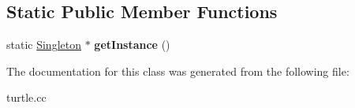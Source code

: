\subsection*{Static Public Member Functions}
\begin{DoxyCompactItemize}
\item 
static \hyperlink{classSingleton}{Singleton} $\ast$ {\bfseries get\+Instance} ()\hypertarget{classSingleton_af8429228a6d84251c342c4f90fc73f44}{}\label{classSingleton_af8429228a6d84251c342c4f90fc73f44}

\end{DoxyCompactItemize}


The documentation for this class was generated from the following file\+:\begin{DoxyCompactItemize}
\item 
turtle.\+cc\end{DoxyCompactItemize}
